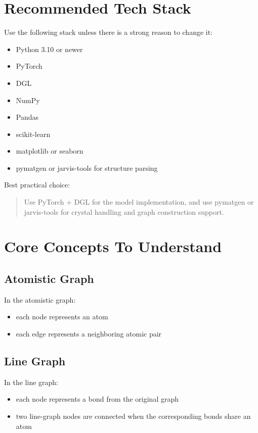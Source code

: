 \documentclass[12pt]{article}
\begin{document}
\section{Recommended Tech Stack}
Use the following stack unless there is a strong reason to change it:

\begin{itemize}
    \item Python 3.10 or newer
    \item PyTorch
    \item DGL
    \item NumPy
    \item Pandas
    \item scikit-learn
    \item matplotlib or seaborn
    \item pymatgen or jarvis-tools for structure parsing
\end{itemize}

Best practical choice:
\begin{quote}
Use PyTorch + DGL for the model implementation, and use pymatgen or jarvis-tools for crystal handling and graph construction support.
\end{quote}

\section{Core Concepts To Understand}
\subsection{Atomistic Graph}
In the atomistic graph:
\begin{itemize}
    \item each node represents an atom
    \item each edge represents a neighboring atomic pair
\end{itemize}

\subsection{Line Graph}
In the line graph:
\begin{itemize}
    \item each node represents a bond from the original graph
    \item two line-graph nodes are connected when the corresponding bonds share an atom
\end{itemize}
\end{document}
